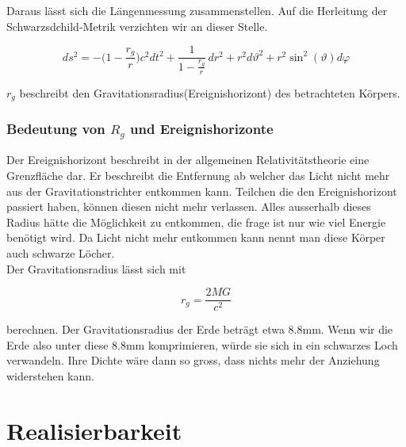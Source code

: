 \begin{refsection}
	Daraus lässt sich die Längenmessung zusammenstellen. Auf die Herleitung der Schwarzsdchild-Metrik verzichten wir an dieser Stelle.

	\begin{equation}
	ds^2
	=
	-\biggl(1-\frac{r_g}r\biggr)c^2dt^2
	+
	\frac{1}{\displaystyle 1-\frac{r_g}r}\,dr^2 
	+
	r^2d\vartheta^2 
	+ 
	r^2\sin^2(\vartheta)d\varphi
	\end{equation}

	$r_g$ beschreibt den Gravitationsradius(Ereignishorizont) des betrachteten Körpers.

	\subsubsection{Bedeutung von $R_{g}$ und Ereignishorizonte}


	Der Ereignishorizont beschreibt in der allgemeinen Relativitätstheorie eine Grenzfläche dar. Er beschreibt die Entfernung ab welcher das Licht nicht mehr aus der Gravitationstrichter entkommen kann. Teilchen die den Ereignishorizont passiert haben, können diesen nicht mehr verlassen. Alles ausserhalb dieses Radius hätte die Möglichkeit zu entkommen, die frage ist nur wie viel Energie benötigt wird. Da Licht nicht mehr entkommen kann nennt man diese Körper auch schwarze Löcher.\\
	Der Gravitationsradius lässt sich mit 

	\begin{equation}
	r_{g}= \frac{2MG}{c^2}
	\end{equation}

	berechnen.
	Der Gravitationsradius der Erde beträgt etwa 8.8mm. Wenn wir die Erde also unter  diese 8.8mm komprimieren, würde sie sich in ein schwarzes Loch verwandeln. Ihre Dichte wäre dann so gross, dass nichts mehr der Anziehung widerstehen kann.
	
	\section{Realisierbarkeit}
	

\end{refsection}
